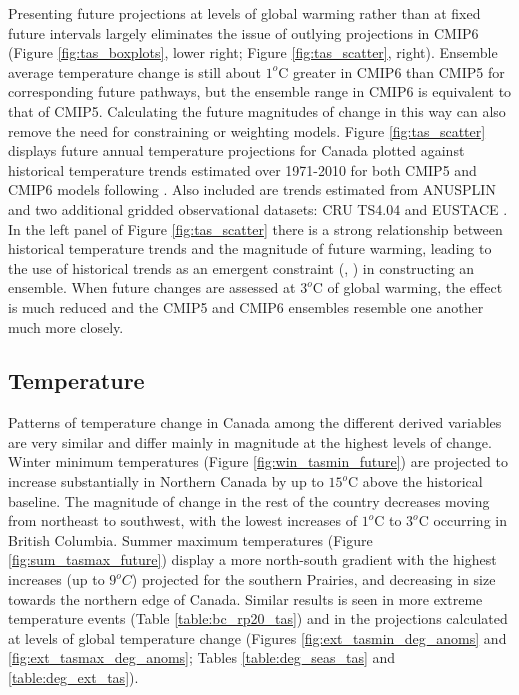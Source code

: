 \documentclass[]{scrartcl}
\begin{document}
Presenting future projections at levels of global warming rather than at fixed future intervals largely eliminates the issue of outlying projections in CMIP6 (Figure \ref{fig:tas_boxplots}, lower right; Figure \ref{fig:tas_scatter}, right). Ensemble average temperature change is still about $1^o$C greater in CMIP6 than CMIP5 for corresponding future pathways, but the ensemble range in CMIP6 is equivalent to that of CMIP5. Calculating the future magnitudes of change in this way can also remove the need for constraining or weighting models. Figure \ref{fig:tas_scatter} displays future annual temperature projections for Canada plotted against historical temperature trends estimated over 1971-2010 for both CMIP5 and CMIP6 models following \cite{Tokarska2020}. Also included are trends estimated from ANUSPLIN and  two additional gridded observational datasets: CRU TS4.04 \citep{Harris2020} and EUSTACE \citep{Brugnara2019}. In the left panel of Figure \ref{fig:tas_scatter} there is a strong relationship between historical temperature trends and the magnitude of future warming, leading to the use of historical trends as an emergent constraint (\citealt{Tokarska2020}, \citealt{Liang2020}) in constructing an ensemble. When future changes are assessed at $3^o$C of global warming, the effect is much reduced and the CMIP5 and CMIP6 ensembles resemble one another much more closely.

\subsection{Temperature}
Patterns of temperature change in Canada among the different derived variables are very similar and differ mainly in magnitude at the highest levels of change. Winter minimum temperatures (Figure \ref{fig:win_tasmin_future}) are projected to increase substantially in Northern Canada by up to $15^o$C above the historical baseline. The magnitude of change in the rest of the country decreases moving from northeast to southwest, with the lowest increases of $1^o$C to $3^o$C occurring in British Columbia. Summer maximum temperatures (Figure \ref{fig:sum_tasmax_future}) display a more north-south gradient with the highest increases (up to $9^oC$) projected for the southern Prairies, and decreasing in size towards the northern edge of Canada. Similar results is seen in more extreme temperature events (Table \ref{table:bc_rp20_tas}) and in the projections calculated at levels of global temperature change (Figures \ref{fig:ext_tasmin_deg_anoms} and \ref{fig:ext_tasmax_deg_anoms}; Tables \ref{table:deg_seas_tas} and \ref{table:deg_ext_tas}). 
\end{document}
